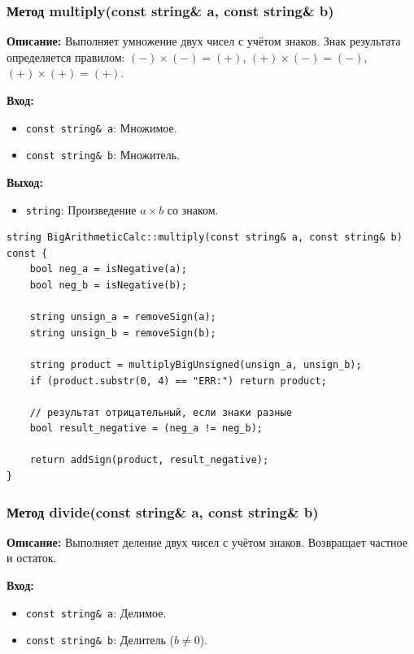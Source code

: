 \subsubsection{Метод multiply(const string\& a, const string\& b)}

\textbf{Описание:} Выполняет умножение двух чисел с учётом знаков.  Знак результата определяется правилом: $(-) \times (-) = (+)$, $(+) \times (-) = (-)$, $(+) \times (+) = (+)$.

\textbf{Вход:}
\begin{itemize}
    \item \texttt{const string\& a}:  Множимое.
    \item \texttt{const string\& b}: Множитель. 
\end{itemize}

\textbf{Выход:}
\begin{itemize}
    \item \texttt{string}: Произведение $a \times b$ со знаком.
\end{itemize}

\begin{lstlisting}[style=cstyle, caption={Реализация multiply()}]
string BigArithmeticCalc::multiply(const string& a, const string& b) const {
    bool neg_a = isNegative(a);
    bool neg_b = isNegative(b);
    
    string unsign_a = removeSign(a);
    string unsign_b = removeSign(b);
    
    string product = multiplyBigUnsigned(unsign_a, unsign_b);
    if (product.substr(0, 4) == "ERR:") return product;
    
    // результат отрицательный, если знаки разные
    bool result_negative = (neg_a != neg_b);
    
    return addSign(product, result_negative);
}
\end{lstlisting}


\subsubsection{Метод divide(const string\& a, const string\& b)}

\textbf{Описание: } Выполняет деление двух чисел с учётом знаков. Возвращает частное и остаток.

\textbf{Вход:}
\begin{itemize}
    \item \texttt{const string\& a}:  Делимое.
    \item \texttt{const string\& b}: Делитель ($b \neq 0$).
\end{itemize}

